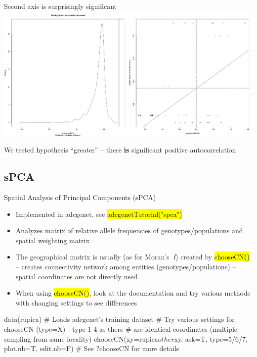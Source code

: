 \documentclass[compress, ucs, xelatex, 11pt, xcolor=svgnames,
  hyperref={
    bookmarks=true,
    unicode=true,
    colorlinks=true,
    pdftitle={Molecular data in R},
    plainpages=false,
    pdfauthor={Vojtech Zeisek},
    pdfsubject={Course about phylogeny and evolution in R},
    pdfcreator={XeLaTeX},
    pdfkeywords={R, evolution, phylogeny, molecular data},
    linkcolor=Tomato,
    anchorcolor=SaddleBrown,
    citecolor=Goldenrod,
    filecolor=DarkMagenta,
    menucolor=Sienna,
    urlcolor=DarkTurquoise,
    pdftex},
  url={hyphens, lowtilde} %
  ]{beamer}
\renewcommand{\texttt}[1]{\hl{\ttfamily #1}}
\begin{document}
\begin{frame}{Second axis is surprisingly significant}
\includegraphics[width=\textwidth]{moran2.png}
\begin{footnotesize}
We tested hypothesis ``greater'' -- there \textbf{is} significant positive autocorrelation
\end{footnotesize}
\end{frame}

\subsection{sPCA}

\begin{frame}[fragile]{Spatial Analysis of Principal Components (sPCA)}
\begin{itemize}
 \item Implemented in adegenet, see \texttt{adegenetTutorial("spca")}
 \item Analyzes matrix of relative allele frequencies of genotypes/populations and spatial weighting matrix
 \item The geographical matrix is usually (as for Moran's~\textit{I}) created by \texttt{chooseCN()} -- creates connectivity network among entities (genotypes/populations) -- spatial coordinates are not directly used
 \item When using \texttt{chooseCN()}, look at the documentation and try various methods with changing settings to see differences
\end{itemize}
  \begin{spluscode}
    data(rupica) # Loads adegenet's training dataset
    # Try various settings for chooseCN (type=X) - type 1-4 as there
    # are identical coordinates (multiple sampling from same locality)
    chooseCN(xy=rupica$other$xy, ask=T, type=5/6/7, plot.nb=T, edit.nb=F)
    # See ?chooseCN for more details
  \end{spluscode}
\end{frame}
\end{document}
